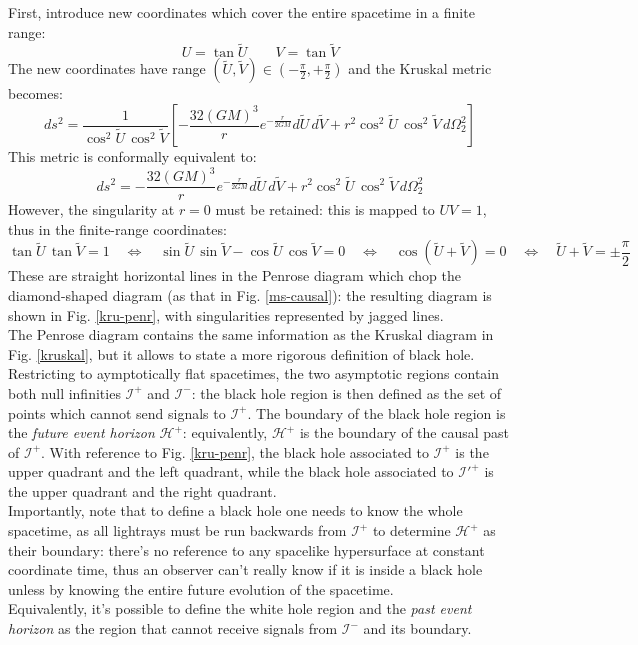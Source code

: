 First, introduce new coordinates which cover the entire spacetime in a finite range:
\begin{equation*}
  U = \tan \tilde{U}
  \qquad
  V = \tan \tilde{V}
\end{equation*}
The new coordinates have range $ (\tilde{U},\tilde{V}) \in (-\frac{\pi}{2}, + \frac{\pi}{2}) $ and the Kruskal metric becomes:
\begin{equation*}
  ds^2 = \frac{1}{\cos^2 \tilde{U} \, \cos^2 \tilde{V}} \left[ - \frac{32 (GM)^3}{r} e^{-\frac{r}{2GM}} d\tilde{U}\,d\tilde{V} + r^2 \cos^2 \tilde{U} \, \cos^2 \tilde{V} \, d\Omega_2^2 \right]
\end{equation*}
This metric is conformally equivalent to:
\begin{equation*}
  ds^2 = - \frac{32 (GM)^3}{r} e^{-\frac{r}{2GM}} d\tilde{U}\,d\tilde{V} + r^2 \cos^2 \tilde{U} \, \cos^2 \tilde{V} \, d\Omega_2^2
\end{equation*}
However, the singularity at $ r = 0 $ must be retained: this is mapped to $ UV = 1 $, thus in the finite-range coordinates:
\begin{equation*}
  \tan \tilde{U} \, \tan \tilde{V} = 1
  \quad \Leftrightarrow \quad
  \sin \tilde{U} \, \sin \tilde{V} - \cos \tilde{U} \, \cos \tilde{V} = 0
  \quad \Leftrightarrow \quad
  \cos (\tilde{U} + \tilde{V}) = 0
  \quad \Leftrightarrow \quad
  \tilde{U} + \tilde{V} = \pm \frac{\pi}{2}
\end{equation*}
These are straight horizontal lines in the Penrose diagram which chop the diamond-shaped diagram (as that in Fig. \ref{ms-causal}): the resulting diagram is shown in Fig. \ref{kru-penr}, with singularities represented by jagged lines.\\
The Penrose diagram contains the same information as the Kruskal diagram in Fig. \ref{kruskal}, but it allows to state a more rigorous definition of black hole. Restricting to aymptotically flat spacetimes, the two asymptotic regions contain both null infinities $ \mathcal{I}^+ $ and $ \mathcal{I}^- $: the black hole region is then defined as the set of points which cannot send signals to $ \mathcal{I}^+ $. The boundary of the black hole region is the \textit{future event horizon} $ \mathcal{H}^+ $: equivalently, $ \mathcal{H}^+ $ is the boundary of the causal past of $ \mathcal{I}^+ $. With reference to Fig. \ref{kru-penr}, the black hole associated to $ \mathcal{I}^+ $ is the upper quadrant and the left quadrant, while the black hole associated to $ \mathcal{I}'^{+} $ is the upper quadrant and the right quadrant.\\
Importantly, note that to define a black hole one needs to know the whole spacetime, as all lightrays must be run backwards from $ \mathcal{I}^+ $ to determine $ \mathcal{H}^+ $ as their boundary: there's no reference to any spacelike hypersurface at constant coordinate time, thus an observer can't really know if it is inside a black hole unless by knowing the entire future evolution of the spacetime.\\
Equivalently, it's possible to define the white hole region and the \textit{past event horizon} as the region that cannot receive signals from $ \mathcal{I}^- $ and its boundary.

